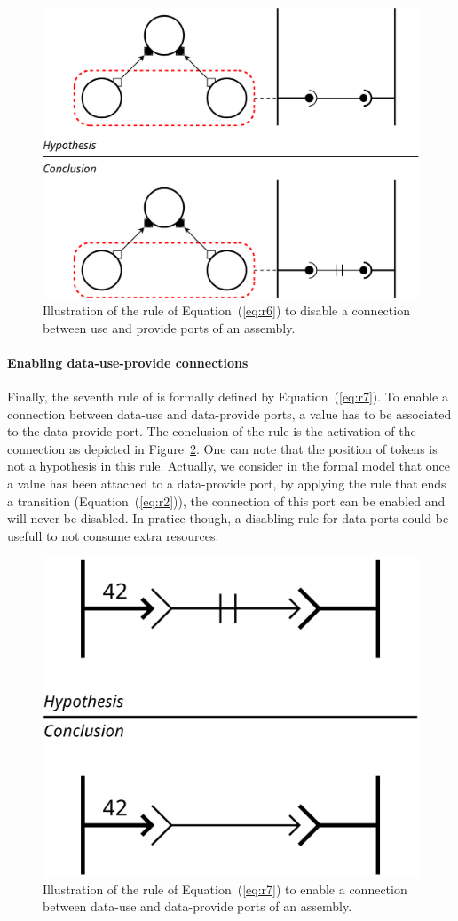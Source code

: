 {{\begin{figure}[t]
\begin{center}
  \includegraphics[width=0.7\columnwidth]{./images/break_service.pdf}
\end{center}
\caption{Illustration of the rule of Equation~(\ref{eq:r6}) to disable a connection between use and provide ports of an assembly.}
\label{fig:r6}
\end{figure}

}

\paragraph{Enabling data-use-provide connections}{

Finally, the seventh rule of \mad is formally defined by
Equation~(\ref{eq:r7}). To enable a connection between data-use and
data-provide ports, a value has to be associated to the data-provide
port. The conclusion of the rule is the activation of the connection as
depicted in Figure~\ref{fig:r7}. One can note that the position of
tokens is not a hypothesis in this rule. Actually, we consider in
the formal model that once a value has been attached to a data-provide
port, by applying the rule that ends a transition
(Equation~(\ref{eq:r2})), the connection of this port can be enabled
and will never be disabled. In pratice though, a disabling rule for
data ports could be usefull to not consume extra resources.
  
\begin{figure}[t]
\begin{center}
  \includegraphics[width=0.4\columnwidth]{./images/link_data.pdf}
\end{center}
\caption{Illustration of the rule of Equation~(\ref{eq:r7}) to enable a connection between data-use and data-provide ports of an assembly.}
\label{fig:r7}
\end{figure}

}}
